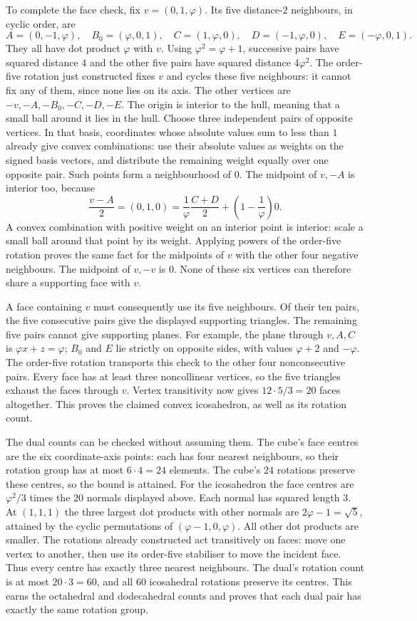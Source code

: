 To complete the face check, fix $v=(0,1,\varphi)$. Its five distance-$2$
neighbours, in cyclic order, are
\[
A=(0,-1,\varphi),\quad B_0=(\varphi,0,1),\quad C=(1,\varphi,0),
\quad D=(-1,\varphi,0),\quad E=(-\varphi,0,1).
\]
They all have dot product $\varphi$ with $v$. Using $\varphi^2=\varphi+1$,
successive pairs have squared distance $4$ and the other five pairs have
squared distance $4\varphi^2$.
The order-five rotation just constructed fixes $v$ and cycles these five
neighbours: it cannot fix any of them, since none lies on its axis.
The other vertices are $-v,-A,-B_0,-C,-D,-E$.
The origin is interior to the hull, meaning that a small ball around it lies
in the hull. Choose three independent pairs of opposite vertices. In that
basis, coordinates whose absolute values sum to less than $1$ already give
convex combinations: use their absolute values as weights on the signed basis
vectors, and distribute the remaining weight equally over one opposite pair.
Such points form a neighbourhood of $0$.
The midpoint of $v,-A$ is interior too, because
\[
\frac{v-A}{2}=(0,1,0)
=\frac1\varphi\frac{C+D}{2}
 +\left(1-\frac1\varphi\right)0.
\]
A convex combination with positive weight on an interior point is interior:
scale a small ball around that point by its weight. Applying powers of the
order-five rotation proves the same fact for the midpoints of $v$ with the
other four negative neighbours. The midpoint of $v,-v$ is $0$.
None of these six vertices can therefore share a supporting face with $v$.

A face containing $v$ must consequently use its five neighbours. Of their
ten pairs, the five consecutive pairs give the displayed supporting triangles.
The remaining five pairs cannot give supporting planes. For example, the plane
through $v,A,C$ is $\varphi x+z=\varphi$; $B_0$ and $E$ lie strictly on
opposite sides, with values $\varphi+2$ and $-\varphi$. The order-five rotation
transports this check to the other four nonconsecutive pairs. Every face has
at least three noncollinear vertices, so the five triangles exhaust the faces
through $v$. Vertex transitivity now gives $12\cdot5/3=20$ faces altogether.
This proves the claimed convex icosahedron, as well as its rotation count.

The dual counts can be checked without assuming them. The cube's face centres
are the six coordinate-axis points: each has four nearest neighbours, so their
rotation group has at most $6\cdot4=24$ elements. The cube's $24$ rotations
preserve these centres, so the bound is attained. For the icosahedron the face
centres are $\varphi^2/3$ times the $20$ normals displayed above. Each normal
has squared length $3$. At $(1,1,1)$ the three largest dot products with other normals are
$2\varphi-1=\sqrt5$, attained by the cyclic permutations of
$(\varphi-1,0,\varphi)$. All other dot products are smaller. The rotations
already constructed act transitively on faces: move one vertex to another,
then use its order-five stabiliser to move the incident face. Thus every
centre has exactly three nearest neighbours. The dual's rotation count is at
most $20\cdot3=60$, and all $60$ icosahedral rotations preserve its centres.
This earns the octahedral and dodecahedral counts and proves that each dual
pair has exactly the same rotation group.

